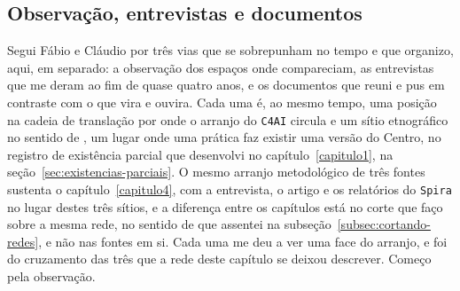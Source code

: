 \subsection{Observação, entrevistas e documentos}
\label{sec:seguindo_atores}

Segui Fábio e Cláudio por três vias que se sobrepunham no tempo e que organizo, aqui, em separado: a observação dos espaços onde compareciam, as entrevistas que me deram ao fim de quase quatro anos, e os documentos que reuni e pus em contraste com o que vira e ouvira. Cada uma é, ao mesmo tempo, uma posição na cadeia de translação por onde o arranjo do \texttt{C4AI} circula e um sítio etnográfico no sentido de \textcite{mol2002body}, um lugar onde uma prática faz existir uma versão do Centro, no registro de existência parcial que desenvolvi no capítulo~\ref{capitulo1}, na seção~\ref{sec:existencias-parciais}. O mesmo arranjo metodológico de três fontes sustenta o capítulo~\ref{capitulo4}, com a entrevista, o artigo e os relatórios do \texttt{Spira} no lugar destes três sítios, e a diferença entre os capítulos está no corte que faço sobre a mesma rede, no sentido de \textcite{strathern2011cortando} que assentei na subseção~\ref{subsec:cortando-redes}, e não nas fontes em si. Cada uma me deu a ver uma face do arranjo, e foi do cruzamento das três que a rede deste capítulo se deixou descrever. Começo pela observação.

